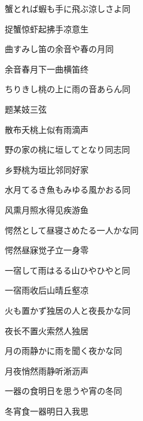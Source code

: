 \begin{haiku}
    {\FH 蟹とれば蝦も手に飛ぶ涼しさよ}\hfill{\FH 同}

    {\FK 捉蟹惊虾起拂手凉意生}
\end{haiku}

\begin{haiku}
    {\FH 曲すみし笛の余音や春の月}\hfill{\FH 同}

    {\FK 余音春月下一曲横笛终}
\end{haiku}

\begin{haiku}
    {\FH ちりきし桃の上に雨の音あらん}\hfill{\FH 同}

    {\FK 题某妓三弦}

    {\FK 散布夭桃上似有雨滴声}
\end{haiku}

\begin{haiku}
    {\FH 野の家の桃に垣してとなり同志}\hfill{\FH 同}

    {\FK 乡野桃为垣比邻同好家}
\end{haiku}

\begin{haiku}
    {\FH 水月てるき魚もみゆる風かおる}\hfill{\FH 同}

    {\FK 风熏月照水得见疾游鱼}
\end{haiku}

\begin{haiku}
    {\FH 愕然として昼寝さめたる一人かな}\hfill{\FH 同}

    {\FK 愕然昼寐觉孑立一身零}
\end{haiku}

\begin{haiku}
    {\FH 一宿して雨はるる山ひやひやと}\hfill{\FH 同}

    {\FK 一宿雨收后山晴丘壑凉}
\end{haiku}

\begin{haiku}
    {\FH 火も置かず独居の人と夜長かな}\hfill{\FH 同}

    {\FK 夜长不置火索然人独居}
\end{haiku}

\begin{haiku}
    {\FH 月の雨静かに雨を聞く夜かな}\hfill{\FH 同}

    {\FK 月夜悄然雨静听淅沥声}
\end{haiku}

\begin{haiku}
    {\FH 一器の食明日を思うや宵の冬}\hfill{\FH 同}

    {\FK 冬宵食一器明日入我思}
\end{haiku}

